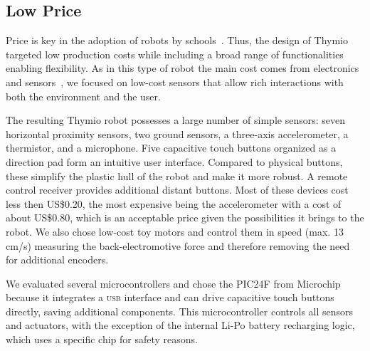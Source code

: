 \documentclass[letterpaper, 10 pt, conference]{ieeeconf}  %
\begin{document}
\subsection{Low Price}

Price is key in the adoption of robots by schools~\cite{kradolfer2014sociological}.
Thus, the design of Thymio targeted low production costs while including a broad range of functionalities enabling flexibility.
As in this type of robot the main cost comes from electronics and sensors~\cite{thesis_michael}, we focused on low-cost sensors that allow rich interactions with both the environment and the user.

The resulting Thymio robot possesses a large number of simple sensors:
seven horizontal proximity sensors, two ground sensors, a three-axis accelerometer, a thermistor, and a microphone.
Five capacitive touch buttons organized as a direction pad form an intuitive user interface.
Compared to physical buttons, these simplify the plastic hull of the robot and make it more robust.
A remote control receiver provides additional distant buttons.
Most of these devices cost less then US\$0.20, the most expensive being the accelerometer with a cost of about US\$0.80, which is an acceptable price given the possibilities it brings to the robot.
We also chose low-cost toy motors and control them in speed (max. 13\,cm/s) measuring the back-electromotive force and therefore removing the need for additional encoders.

We evaluated several microcontrollers and chose the PIC24F from Microchip because it integrates a \textsc{usb} interface and can drive capacitive touch buttons directly, saving additional components. 
This microcontroller controls all sensors and actuators, with the exception of the internal Li-Po battery recharging logic, which uses a specific chip for safety reasons.
\end{document}
